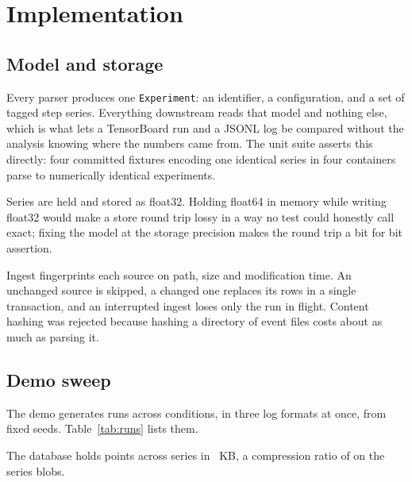 \documentclass[11pt,a4paper]{report}
\begin{document}
\chapter{Implementation}
\label{ch:implementation}

\section{Model and storage}

Every parser produces one \texttt{Experiment}: an identifier, a configuration,
and a set of tagged step series. Everything downstream reads that model and
nothing else, which is what lets a TensorBoard run and a JSONL log be compared
without the analysis knowing where the numbers came from. The unit suite asserts
this directly: four committed fixtures encoding one identical series in four
containers parse to numerically identical experiments.

Series are held and stored as float32. Holding float64 in memory while writing
float32 would make a store round trip lossy in a way no test could honestly call
exact; fixing the model at the storage precision makes the round trip a bit for
bit assertion.

Ingest fingerprints each source on path, size and modification time. An unchanged
source is skipped, a changed one replaces its rows in a single transaction, and
an interrupted ingest loses only the run in flight. Content hashing was rejected
because hashing a directory of event files costs about as much as parsing it.

\section{Demo sweep}

The demo generates \factruns{} runs across \factconditions{} conditions, in three
log formats at once, from fixed seeds. Table~\ref{tab:runs} lists them.

\begin{table}[htbp]
\centering
\small

\caption{The synthetic demo sweep. Spread is the standard deviation across seeds
within a condition, and it is the quantity every claim in the next chapter has to
overcome.}
\label{tab:runs}
\end{table}

The database holds \factpoints{} points across \factseries{} series in
\factdatabasekb{}~KB, a compression ratio of \factcompressionratio{} on the
series blobs.
\end{document}
